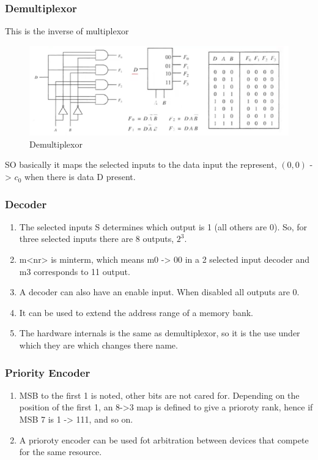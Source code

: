 \documentclass[11pt, a4paper]{article}
\begin{document}
\subsubsection{Demultiplexor}
This is the inverse of multiplexor
\begin{figure}[H]
    \centering
    \includegraphics{Pictures/Demultiplexor.png}
    \caption{Demultiplexor}
\end{figure}
SO basically it maps the selected inputs to the data input the represent, $(0,0)$ -> $c_0$ when there is data D present.

\subsubsection{Decoder}
\begin{enumerate}
    \item The selected inputs S determines which output is 1 (all others are 0). So, for three selected inputs there are 8 outputs, $2^{3}$.
    \item m<nr> is minterm, which means m0 -> 00 in a 2 selected input decoder and m3 corresponds to 11 output.
    \item A decoder can also have an enable input. When disabled all outputs are 0.
    \item It can be used to extend the address range of a memory bank.
    \item The hardware internals is the same as demultiplexor, so it is the use under which they are which changes there name.
\end{enumerate}

\subsubsection{Priority Encoder}
\begin{enumerate}
    \item MSB to the first 1 is noted, other bits are not cared for. Depending on the position of the first 1, an 8->3 map is defined to give a prioroty rank, hence if MSB 7 is 1 -> 111, and so on.
    \item A prioroty encoder can be used fot arbitration between devices that compete for the same resource.
\end{enumerate}
\end{document}
